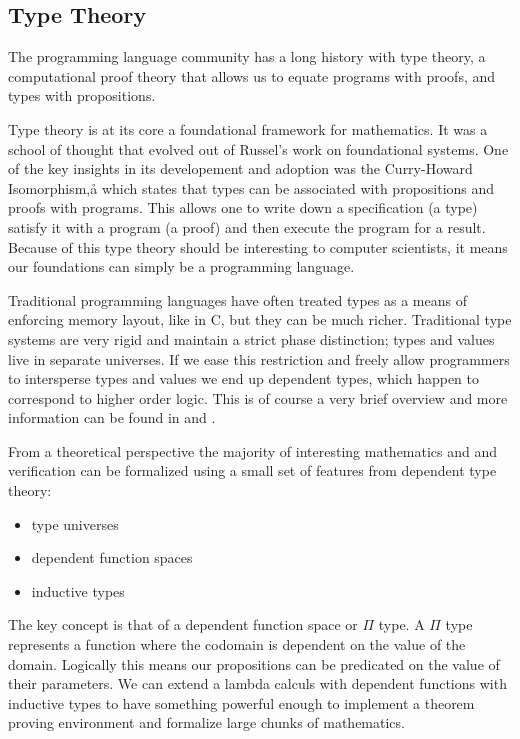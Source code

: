 \subsection{Type Theory}

The programming language community has a long history with type theory, a
computational proof theory that allows us to equate programs with proofs,
and types with propositions.

Type theory is at its core a foundational framework for mathematics. It was a
school of thought that evolved out of Russel's work on foundational systems. One of the
key insights in its developement and adoption was the Curry-Howard Isomorphism,å
which states that types can be associated with propositions and proofs with programs.
This allows one to write down a specification (a type) satisfy it with
a program (a proof) and then execute the program for a result. Because
of this type theory should be interesting to computer scientists, it means our
foundations can simply be a programming language.

Traditional programming languages have often treated types as a means of enforcing
memory layout, like in C, but they can be much richer. Traditional type systems
are very rigid and maintain a strict phase distinction; types and values
live in separate universes. If we ease this restriction and freely allow programmers
to intersperse types and values we end up dependent types, which happen to
correspond to higher order logic. This is of course a very brief overview
and more information can be found in \cite{Pierce:TypeSystems} \cite{martinlof}
and \cite{HoTTbook}.

From a theoretical perspective the majority of interesting mathematics and
and verification can be formalized using a small set of features from dependent
type theory:\\

\begin{itemize}
    \item type universes
    \item dependent function spaces
    \item inductive types\\
\end{itemize}

The key concept is that of a dependent function space or $\Pi$ type.
A $\Pi$ type represents a function where the codomain is dependent on the value
of the domain. Logically this means our propositions can be predicated on the
value of their parameters. We can extend a lambda calculs with dependent functions
with inductive types to have something powerful enough to implement a
theorem proving environment and formalize large chunks of mathematics.

